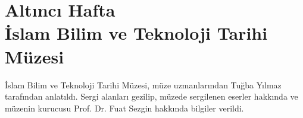 \section{Altıncı Hafta\\İslam Bilim ve Teknoloji Tarihi Müzesi}
\indent\indent İslam Bilim ve Teknoloji Tarihi Müzesi, müze uzmanlarından Tuğba Yılmaz tarafından anlatıldı. Sergi alanları gezilip, müzede sergilenen eserler hakkında ve müzenin kurucusu Prof. Dr. Fuat Sezgin hakkında bilgiler verildi.

